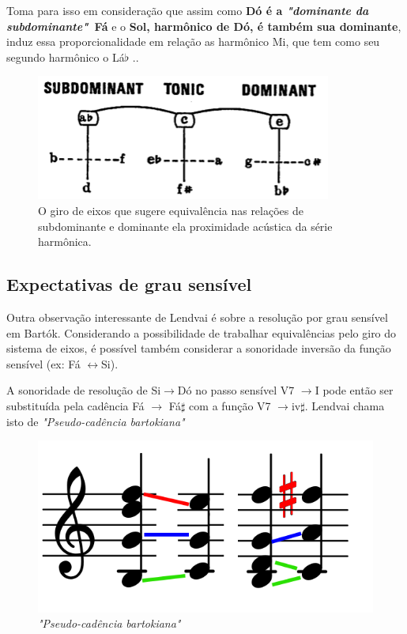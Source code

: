 \documentclass[
	12pt,				%
	openright,			%
	twoside,			%
	a4paper,			%
	english,			%
	french,				%
	spanish,			%
	brazil				%
	]{abntex2}
\begin{document}
Toma para isso em consideração que assim como \textbf{Dó é a \textit{"dominante da subdominante"}\ Fá} e o \textbf{Sol, harmônico de Dó, é também sua dominante}, induz essa proporcionalidade em relação as harmônico Mi, que tem como seu segundo harmônico o Lá$\flat$ .\cite[ p.11]{lendvai1971bela}.

\begin{figure}[!h]
	\caption{\label{fig_grafico}O giro de eixos que sugere equivalência nas relações de subdominante e dominante ela proximidade acústica da série harmônica. }
	\begin{center}
	    \includegraphics[scale=0.5]{axis/giro_de_eixos.png}
	\end{center}
\end{figure}


\pagebreak
\subsection{Expectativas de grau sensível}

Outra observação interessante de Lendvai é sobre a resolução por grau sensível em Bartók. Considerando a possibilidade de trabalhar equivalências pelo giro do sistema de eixos, é possível também considerar a sonoridade inversão da função sensível (ex: Fá $\leftrightarrow$Si).

A sonoridade de resolução de Si$\rightarrow$Dó no passo sensível V7 $\rightarrow$I pode então ser substituída pela cadência Fá  $\rightarrow$ Fá$\sharp$ com a função  V7 $\rightarrow$iv$\sharp$. Lendvai chama isto de \textit{"Pseudo-cadência bartokiana"}\cite[ p.13]{lendvai1971bela}

\begin{figure}[!h]
	\caption{\label{fig_grafico}\textit{"Pseudo-cadência bartokiana"} }
	\begin{center}
	    \includegraphics[scale=0.4]{axis/resolve.png}
	\end{center}
\end{figure}
\end{document}
